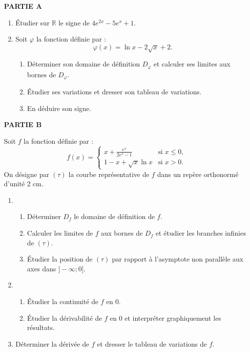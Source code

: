 \documentclass[12pt,a4paper]{article}
\begin{document}
\begin{multicols}{2}
\textbf{PARTIE A}

\begin{enumerate}
    \item Étudier sur \( \mathbb{R} \) le signe de \( 4e^{2x} - 5e^x + 1 \).
    \item Soit \( \varphi \) la fonction définie par : 
    \[
    \varphi(x) = \ln x - 2\sqrt{x} + 2.
    \]
    \begin{enumerate}
        \item Déterminer son domaine de définition \( D_\varphi \) et calculer ses limites aux bornes de \( D_\varphi \).
        \item Étudier ses variations et dresser son tableau de variations.
        \item En déduire son signe.
    \end{enumerate}
\end{enumerate}

\textbf{PARTIE B}

Soit \( f \) la fonction définie par :
\[
f(x) = \begin{cases}
x + \frac{e^x}{2e^x - 1} & \text{si } x \leq 0, \\
1 - x + \sqrt{x} \ln x & \text{si } x > 0.
\end{cases}
\]
On désigne par \( (\tau) \) la courbe représentative de \( f \) dans un repère orthonormé d’unité 2 cm.
\begin{enumerate}
    \item 
    \begin{enumerate}
    \item Déterminer \( D_f \) le domaine de définition de \( f \).
    \item Calculer les limites de \( f \) aux bornes de \( D_f \) et étudier les branches infinies de \( (\tau) \).
    \item Étudier la position de \( (\tau) \) par rapport à l’asymptote non parallèle aux axes dans \( ]-\infty; 0] \).
\end{enumerate}
\item  
\begin{enumerate}
    \item Étudier la continuité de \( f \) en \( 0 \).
    \item Étudier la dérivabilité de \( f \) en \( 0 \) et interpréter graphiquement les résultats.
\end{enumerate}

\item  Déterminer la dérivée de \( f \) et dresser le tableau de variations de \( f \).


\end{enumerate}
\end{multicols}
\end{document}
